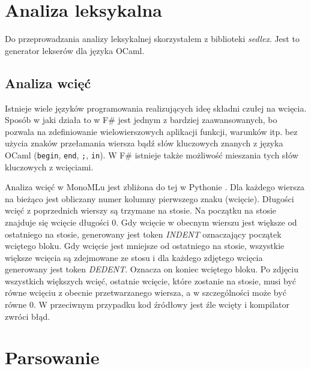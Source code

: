 \documentclass[declaration,shortabstract]{iithesis}
\begin{document}


\section{Analiza leksykalna}

Do przeprowadzania analizy leksykalnej skorzystałem z biblioteki 
\textit{sedlex}. Jest to generator lekserów dla języka OCaml.

\subsection{Analiza wcięć} \label{wciecia_omowienie}
 
Istnieje wiele języków programowania realizujących ideę składni czułej na 
wcięcia. Sposób w jaki działa to w F\# jest jednym z bardziej zaawansowanych,
bo pozwala na zdefiniowanie wielowierszowych aplikacji funkcji, warunków itp. 
bez użycia znaków przełamania wiersza bądź słów kluczowych znanych 
z języka OCaml (\texttt{begin}, \texttt{end}, \texttt{;}, \texttt{in}).
 W F\# 
istnieje 
także możliwość mieszania tych słów kluczowych z wcięciami. 

Analiza wcięć w MonoMLu jest zbliżona do tej w Pythonie
\cite{python_indentation}. Dla każdego wiersza
na bieżąco jest obliczany numer kolumny pierwszego znaku (wcięcie). Długości 
wcięć z poprzednich wierszy są trzymane na stosie. Na początku na stosie
znajduje się wcięcie długości $0$. Gdy wcięcie w obecnym wierszu jest większe od 
ostatniego na stosie, generowany jest token \textit{INDENT} oznaczający 
początek wciętego bloku. Gdy wcięcie jest mniejsze od ostatniego na stosie, 
wszystkie większe wcięcia są zdejmowane ze stosu i dla każdego zdjętego wcięcia 
generowany jest token \textit{DEDENT}. Oznacza on koniec wciętego bloku. 
Po zdjęciu 
wszystkich większych wcięć, ostatnie wcięcie, które zostanie na stosie, musi być 
równe wcięciu z obecnie przetwarzanego wiersza, a w szczególności może być równe $0$. 
W przeciwnym 
przypadku kod źródłowy jest źle wcięty i kompilator zwróci błąd.

\section{Parsowanie}
\end{document}
